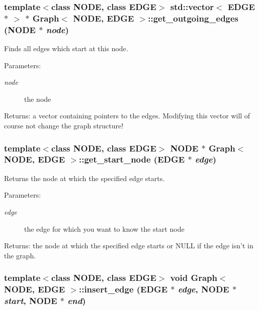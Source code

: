 \subsubsection{\setlength{\rightskip}{0pt plus 5cm}template$<$class NODE, class EDGE$>$ std::vector$<$ EDGE $\ast$ $>$ $\ast$ {\bf Graph}$<$ NODE, EDGE $>$::get\_\-outgoing\_\-edges (NODE $\ast$ {\em node})}\label{classGraph_Grapha6}


Finds all edges which start at this node. 

\begin{Desc}
\item[Parameters:]
\begin{description}
\item[{\em node}]the node \end{description}
\end{Desc}
\begin{Desc}
\item[Returns:]a vector containing pointers to the edges. Modifying this vector will of course not change the graph structure!\end{Desc}
\subsubsection{\setlength{\rightskip}{0pt plus 5cm}template$<$class NODE, class EDGE$>$ NODE $\ast$ {\bf Graph}$<$ NODE, EDGE $>$::get\_\-start\_\-node (EDGE $\ast$ {\em edge})}\label{classGraph_Grapha8}


Returns the node at which the specified edge starts. 

\begin{Desc}
\item[Parameters:]
\begin{description}
\item[{\em edge}]the edge for which you want to know the start node \end{description}
\end{Desc}
\begin{Desc}
\item[Returns:]the node at which the specified edge starts or NULL if the edge isn't in the graph.\end{Desc}
\subsubsection{\setlength{\rightskip}{0pt plus 5cm}template$<$class NODE, class EDGE$>$ void {\bf Graph}$<$ NODE, EDGE $>$::insert\_\-edge (EDGE $\ast$ {\em edge}, NODE $\ast$ {\em start}, NODE $\ast$ {\em end})}\label{classGraph_Grapha2}


